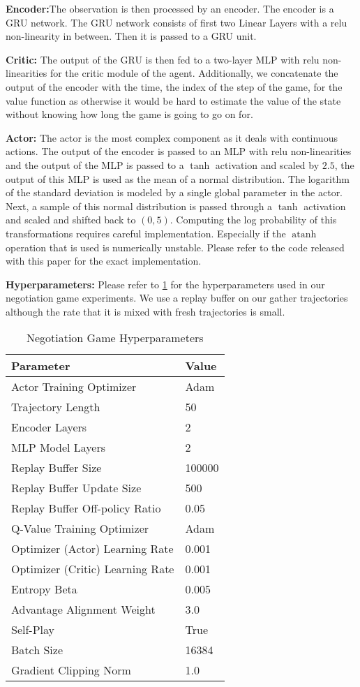 \documentclass{article} \usepackage{iclr2025_conference,times}
\begin{document}
\textbf{Encoder:}The observation is then processed by an encoder. The encoder is a GRU network. The GRU network consists of first two Linear Layers with a relu non-linearity in between. Then it is passed to a GRU unit. 

\textbf{Critic:} The output of the GRU is then fed to a two-layer MLP with relu non-linearities for the critic module of the agent. Additionally, we concatenate the output of the encoder with the time, the index of the step of the game, for the value function as otherwise it would be hard to estimate the value of the state without knowing how long the game is going to go on for.

\textbf{Actor:} The actor is the most complex component as it deals with continuous actions. The output of the encoder is passed to an MLP with relu non-linearities and the output of the MLP is passed to a $\tanh$ activation and scaled by $2.5$, the output of this MLP is used as the mean of a normal distribution. The logarithm of the standard deviation is modeled by a single global parameter in the actor. Next, a sample of this normal distribution is passed through a $\tanh$ activation and scaled and shifted back to $(0, 5)$. Computing the log probability of this transformations requires careful implementation. Especially if the $\operatorname{atanh}$ operation that is used is numerically unstable. Please refer to the code released with this paper for the exact implementation. 

\textbf{Hyperparameters:}
Please refer to \ref{tab:negotiation_game} for the hyperparameters used in our negotiation game experiments. We use a replay buffer on our gather trajectories although the rate that it is mixed with fresh trajectories is small. 

\begin{table}[h]
\centering
\caption{Negotiation Game Hyperparameters}
\label{tab:negotiation_game}
\begin{tabular}{ll}
\textbf{Parameter} & \textbf{Value} \\ \hline
Actor Training Optimizer & Adam \\
Trajectory Length & 50 \\
Encoder Layers & 2 \\
MLP Model Layers & 2 \\
Replay Buffer Size & 100000 \\
Replay Buffer Update Size & 500 \\
Replay Buffer Off-policy Ratio & 0.05 \\
Q-Value Training Optimizer & Adam \\
Optimizer (Actor) Learning Rate & 0.001 \\
Optimizer (Critic) Learning Rate & 0.001 \\
Entropy Beta & 0.005 \\
Advantage Alignment Weight & 3.0 \\
Self-Play & True \\
Batch Size & 16384 \\
Gradient Clipping Norm & 1.0 \\
\end{tabular}
\end{table}
\end{document}
